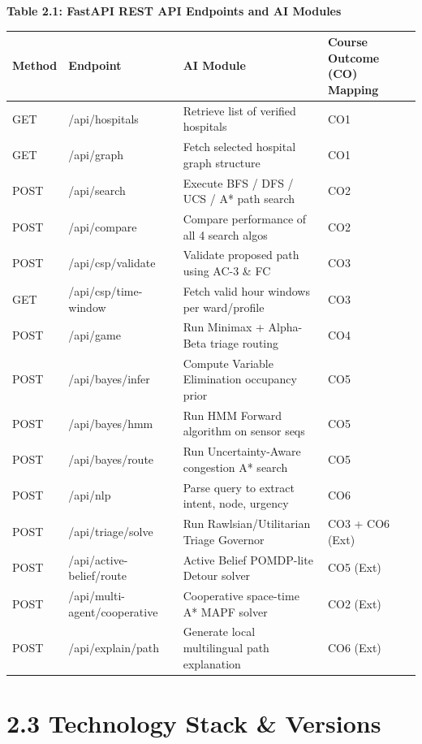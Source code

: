 \documentclass[12pt,a4paper]{report}
\begin{document}
\begin{center}\textbf{Table 2.1: FastAPI REST API Endpoints and AI Modules}\end{center}
\begin{table}[htbp]
\centering
\small
\begin{tabularx}{\textwidth}{|l|l|X|l|}
\hline
Method & Endpoint & AI Module & Course Outcome (CO) Mapping \\
\hline
\hline
GET & /api/hospitals & Retrieve list of verified hospitals & CO1 \\
\hline
GET & /api/graph & Fetch selected hospital graph structure & CO1 \\
\hline
POST & /api/search & Execute BFS / DFS / UCS / A* path search & CO2 \\
\hline
POST & /api/compare & Compare performance of all 4 search algos & CO2 \\
\hline
POST & /api/csp/validate & Validate proposed path using AC-3 \& FC & CO3 \\
\hline
GET & /api/csp/time-window & Fetch valid hour windows per ward/profile & CO3 \\
\hline
POST & /api/game & Run Minimax + Alpha-Beta triage routing & CO4 \\
\hline
POST & /api/bayes/infer & Compute Variable Elimination occupancy prior & CO5 \\
\hline
POST & /api/bayes/hmm & Run HMM Forward algorithm on sensor seqs & CO5 \\
\hline
POST & /api/bayes/route & Run Uncertainty-Aware congestion A* search & CO5 \\
\hline
POST & /api/nlp & Parse query to extract intent, node, urgency & CO6 \\
\hline
POST & /api/triage/solve & Run Rawlsian/Utilitarian Triage Governor & CO3 + CO6 (Ext) \\
\hline
POST & /api/active-belief/route & Active Belief POMDP-lite Detour solver & CO5 (Ext) \\
\hline
POST & /api/multi-agent/cooperative & Cooperative space-time A* MAPF solver & CO2 (Ext) \\
\hline
POST & /api/explain/path & Generate local multilingual path explanation & CO6 (Ext) \\
\hline
\end{tabularx}
\end{table}

\section{2.3 Technology Stack \& Versions}
\end{document}
